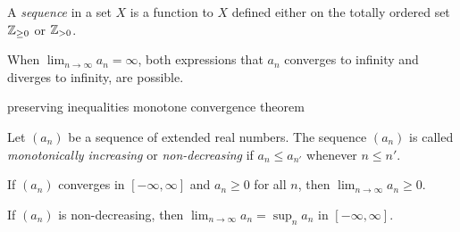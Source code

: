 \documentclass{../../large}
\begin{document}
\begin{prb}
A \emph{sequence} in a set $X$ is a function to $X$ defined either on the totally ordered set $\mathbb{Z}_{\ge0}$ or $\mathbb{Z}_{>0}$.

When $\lim_{n\to\infty}a_n=\infty$, both expressions that $a_n$ converges to infinity and diverges to infinity, are possible.
\end{prb}


\begin{prb}
preserving inequalities
monotone convergence theorem

Let $(a_n)$ be a sequence of extended real numbers.
The sequence $(a_n)$ is called \emph{monotonically increasing} or \emph{non-decreasing} if $a_n\le a_{n'}$ whenever $n\le n'$.
\begin{parts}
\item If $(a_n)$ converges in $[-\infty,\infty]$ and $a_n\ge0$ for all $n$, then $\lim_{n\to\infty}a_n\ge0$.
\item If $(a_n)$ is non-decreasing, then $\lim_{n\to\infty}a_n=\sup_na_n$ in $[-\infty,\infty]$.
\item
\end{parts}
\end{prb}
\end{document}
